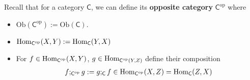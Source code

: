 Recall that for a category $\textsf{C}$, we can define its \textbf{opposite category} $\textsf{C}^{\text{op}}$ where
\begin{itemize}
  \item $\text{Ob}(\textsf{C}^{\text{op}}) := \text{Ob}(\textsf{C})$.
  \item $\operatorname{Hom}_{\textsf{C}^{\text{op}}}(X,Y) := \operatorname{Hom}_{\textsf{C}}(Y,X)$
  \item For $f \in \operatorname{Hom}_{\textsf{C}^{\text{op}}}(X,Y)$, $g \in \operatorname{Hom}_{\textsf{C}^{\text{op}}(Y,Z)}$ define their composition
    \begin{align*}
      f;_{\textsf{C}^{\text{op}}}g := g;_{\textsf{C}}f \in \operatorname{Hom}_{\textsf{C}^{\text{op}}}(X,Z) = \operatorname{Hom}_{\textsf{C}}(Z,X)
    \end{align*}
\end{itemize}


